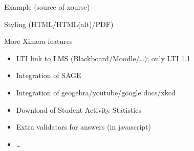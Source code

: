 \begin{frame}{Example (source of xourse)}
  \vspace{-0.3cm}
  \begin{center}
  \end{center}
\end{frame}


\begin{frame}[t]{Styling (HTML/HTML(alt)/PDF)}
  \begin{center}
  \end{center}
\end{frame}

\begin{frame}{More Ximera features}
  \begin{itemize}
  \item LTI link to LMS (Blackboard/Moodle/\ldots); only LTI 1.1
  \item Integration of SAGE
  \item Integration of geogebra/youtube/google docs/xkcd
  \item Download of Student Activity Statistics
  \item Extra validators for answers (in javascript)
  \item \ldots
  \end{itemize}
\end{frame}


